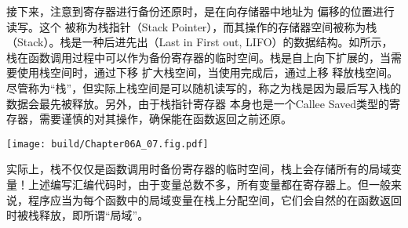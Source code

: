 接下来，注意到寄存器进行备份还原时，是在向存储器中地址为 偏移的位置进行读写。这个 被称为栈指针（Stack Pointer），而其操作的存储器空间被称为栈（Stack）。栈是一种后进先出（Last in First out, LIFO）的数据结构。如所示，栈在函数调用过程中可以作为备份寄存器的临时空间。栈是自上向下扩展的，当需要使用栈空间时，通过下移 扩大栈空间，当使用完成后，通过上移 释放栈空间。尽管称为“栈”，但实际上栈空间是可以随机读写的，称之为栈是因为最后写入栈的数据会最先被释放。另外，由于栈指针寄存器 本身也是一个Callee Saved类型的寄存器，需要谨慎的对其操作，确保能在函数返回之前还原。

\begin{Figure}[栈在函数调用中的使用]
    \texttt{[image: build/Chapter06A\_07.fig.pdf]}
\end{Figure}

实际上，栈不仅仅是函数调用时备份寄存器的临时空间，栈上会存储所有的局域变量！上述编写汇编代码时，由于变量总数不多，所有变量都在寄存器上。但一般来说，程序应当为每个函数中的局域变量在栈上分配空间，它们会自然的在函数返回时被栈释放，即所谓“局域”。
